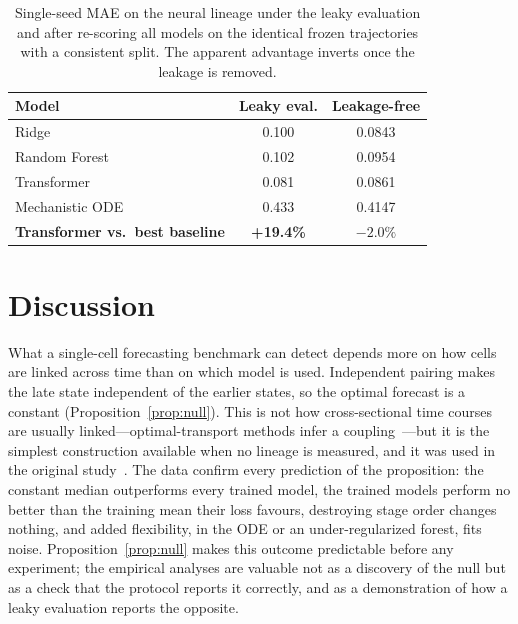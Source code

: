 \documentclass[10pt,journal,compsoc]{IEEEtran}
\begin{document}
\begin{table}[!t]
\centering
\caption{Single-seed MAE on the neural lineage under the leaky evaluation and after re-scoring all models on the identical frozen trajectories with a consistent split. The apparent advantage inverts once the leakage is removed.}
\label{tab:leakage}
\footnotesize
\setlength{\tabcolsep}{6pt}
\begin{tabular}{lcc}
\toprule
\textbf{Model} & \textbf{Leaky eval.} & \textbf{Leakage-free} \\
\midrule
Ridge & 0.100 & 0.0843 \\
Random Forest & 0.102 & 0.0954 \\
Transformer & 0.081 & 0.0861 \\
Mechanistic ODE & 0.433 & 0.4147 \\
\midrule
\textbf{Transformer vs.\ best baseline} & \textbf{+19.4\%} & \textbf{$-2.0\%$} \\
\bottomrule
\end{tabular}
\end{table}

\section{Discussion}
\label{sec:discussion}

What a single-cell forecasting benchmark can detect depends more on how cells are linked across time than on which model is used. Independent pairing makes the late state independent of the earlier states, so the optimal forecast is a constant (Proposition~\ref{prop:null}). This is not how cross-sectional time courses are usually linked---optimal-transport methods infer a coupling~\cite{schiebinger2019optimal}---but it is the simplest construction available when no lineage is measured, and it was used in the original study~\cite{kanu2026transformer}. The data confirm every prediction of the proposition: the constant median outperforms every trained model, the trained models perform no better than the training mean their loss favours, destroying stage order changes nothing, and added flexibility, in the ODE or an under-regularized forest, fits noise. Proposition~\ref{prop:null} makes this outcome predictable before any experiment; the empirical analyses are valuable not as a discovery of the null but as a check that the protocol reports it correctly, and as a demonstration of how a leaky evaluation reports the opposite.
\end{document}
